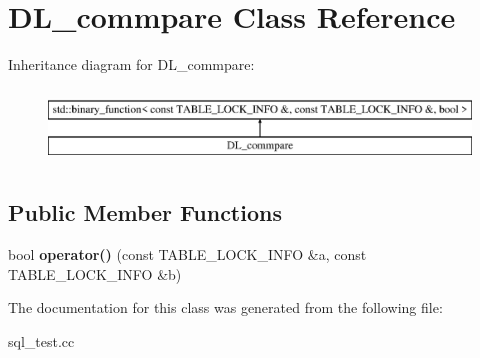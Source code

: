 \hypertarget{classDL__commpare}{}\section{D\+L\+\_\+commpare Class Reference}
\label{classDL__commpare}
Inheritance diagram for D\+L\+\_\+commpare\+:\begin{figure}[H]
\begin{center}
\leavevmode
\includegraphics[height=2.000000cm]{classDL__commpare}
\end{center}
\end{figure}
\subsection*{Public Member Functions}
\begin{DoxyCompactItemize}
\item 
\mbox{\label{classDL__commpare_a9a9cb26195a17a8cbcf14d27223ceca5}} 
bool {\bfseries operator()} (const T\+A\+B\+L\+E\+\_\+\+L\+O\+C\+K\+\_\+\+I\+N\+FO \&a, const T\+A\+B\+L\+E\+\_\+\+L\+O\+C\+K\+\_\+\+I\+N\+FO \&b)
\end{DoxyCompactItemize}


The documentation for this class was generated from the following file\+:\begin{DoxyCompactItemize}
\item 
sql\+\_\+test.\+cc\end{DoxyCompactItemize}
